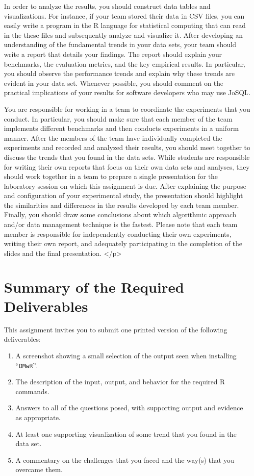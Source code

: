 In order to analyze the results, you should construct data tables and visualizations.  For instance, if your team stored
their data in CSV files, you can easily write a program in the R language for statistical computing that can read in the
these files and subsequently analyze and visualize it. After developing an understanding of the fundamental
trends in your data sets, your team should write a report that details your findings.  The report should explain your
benchmarks, the evaluation metrics, and the key empirical results.  In particular, you should observe the performance
trends and explain why these trends are evident in your data set.  Whenever possible, you should comment on the
practical implications of your results for software developers who may use JoSQL.  

You are responsible for working in a team to coordinate the experiments that you conduct.  In particular, you should
make sure that each member of the team implements different benchmarks and then conducts experiments in a uniform
manner.  After the members of the team have individually completed the experiments and recorded and analyzed their
results, you should meet together to discuss the trends that you found in the data sets.  While students are responsible
for writing their own reports that focus on their own data sets and analyses, they should work together in a team to
prepare a single presentation for the laboratory session on which this assignment is due.  After explaining the purpose
and configuration of your experimental study, the presentation should highlight the similarities and differences in the
results developed by each team member.  Finally, you should draw some conclusions about which algorithmic approach
and/or data management technique is the fastest.  Please note that each team member is responsible for independently
conducting their own experiments, writing their own report, and adequately participating in the completion of the slides
and the final presentation.  </p>


\section*{Summary of the Required Deliverables}

  This assignment invites you to submit one printed version of the following deliverables:

  \vspace*{-.05in}
  \begin{enumerate}
    \setlength{\itemsep}{0pt}
    \item A screenshot showing a small selection of the output seen when installing ``{\tt DMwR}''.
    \item The description of the input, output, and behavior for the required R commands.
    \item Answers to all of the questions posed, with supporting output and evidence as appropriate. 
    \item At least one supporting visualization of some trend that you found in the data set. 
    \item A commentary on the challenges that you faced and the way(s) that you overcame them.
  \end{enumerate}

